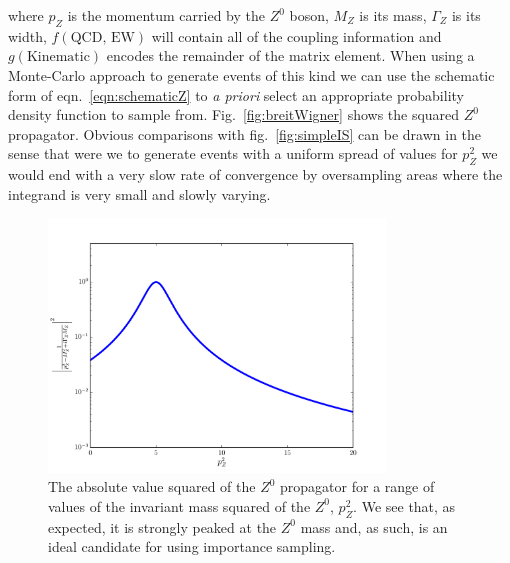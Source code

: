   	where $p_Z$ is the momentum carried by the $Z^0$ boson, $M_Z$ is its mass, $\Gamma_Z$ is its width, $f(\text{QCD, EW})$ will
  	contain all of the coupling information and $g(\text{Kinematic})$ encodes the remainder of the matrix element.  When using a
  	Monte-Carlo approach to generate events of this kind we can use the schematic form of eqn.~\eqref{eqn:schematicZ} to \emph{a priori} select
  	an appropriate probability density function to sample from.  Fig.~\eqref{fig:breitWigner} shows the squared $Z^0$ propagator.
  	Obvious comparisons with fig.~\eqref{fig:simpleIS} can be drawn in the sense that were we to generate events with a uniform spread
  	of values for $p_Z^2$ we would end with a very slow rate of convergence by oversampling areas where the integrand is very small and slowly varying.

	\begin{figure}[hbt]
		\centering
		\includegraphics[width=0.8\textwidth, height=0.6\textwidth]{breitWigner}
		\caption{The absolute value squared of the $Z^0$ propagator for a range of values of the invariant mass squared of the
		$Z^0$, $p_Z^2$.  We see that, as expected, it is strongly peaked at the $Z^0$ mass and, as such, is an ideal
		candidate for using importance sampling.}
		\label{fig:breitWigner}
  	\end{figure}

